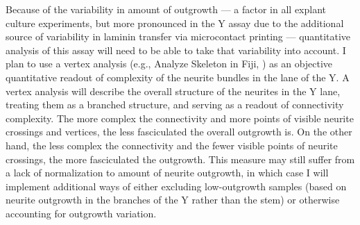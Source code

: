 Because of the variability in amount of outgrowth --- a factor in all explant culture experiments, but more pronounced in the Y assay due to the additional source of variability in laminin transfer via microcontact printing --- quantitative analysis of this assay will need to be able to take that variability into account.
I plan to use a vertex analysis (e.g., Analyze Skeleton in Fiji, ) as an objective quantitative readout of complexity of the neurite bundles in the lane of the Y.
A vertex analysis will describe the overall structure of the neurites in the Y lane, treating them as a branched structure, and serving as a readout of connectivity complexity.
The more complex the connectivity and more points of visible neurite crossings and vertices, the less fasciculated the overall outgrowth is.
On the other hand, the less complex the connectivity and the fewer visible points of neurite crossings, the more fasciculated the outgrowth.
This measure may still suffer from a lack of normalization to amount of neurite outgrowth, in which case I will implement additional ways of either excluding low-outgrowth samples (based on neurite outgrowth in the branches of the Y rather than the stem) or otherwise accounting for outgrowth variation.
%
%
%
